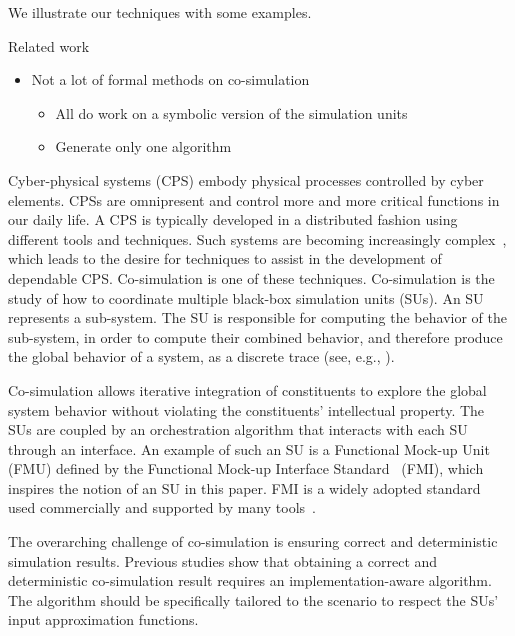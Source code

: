   We illustrate our techniques with some examples.
  
  Related work
  \begin{itemize}
    \item Not a lot of formal methods on co-simulation
    \begin{itemize}
      \item All do work on a symbolic version of the simulation units
      \item Generate only one algorithm
    \end{itemize}
  \end{itemize}

Cyber-physical systems (CPS) embody physical processes controlled by cyber elements. 
CPSs are omnipresent and control more and more critical functions in our daily life.
A CPS is typically developed in a distributed fashion using different tools and techniques. 
Such systems are becoming increasingly complex~\cite{4519604}, which leads to the desire for techniques to assist in the development of dependable CPS.
Co-simulation is one of these techniques. Co-simulation is the study of how to coordinate multiple black-box simulation units (SUs).
An SU represents a sub-system. 
The SU is responsible for computing the behavior of the sub-system, in order to compute their combined behavior, and therefore produce the global behavior of a system, as a discrete trace (see, e.g., \cite{Kubler2000,Gomes2018}).

Co-simulation allows iterative integration of constituents to explore the global system behavior without violating the constituents' intellectual property. 
The SUs are coupled by an orchestration algorithm that interacts with each SU through an interface.
An example of such an SU is a Functional Mock-up Unit (FMU) defined by the Functional Mock-up Interface Standard~\cite{FMI2014} (FMI), which inspires the notion of an SU in this paper. FMI is a widely adopted standard used commercially and supported by many tools~\cite{Tools_FMI}.

The overarching challenge of co-simulation is ensuring correct and deterministic simulation results. 
Previous studies \cite{Gomes2019,Oakes2021,Gomes2018f,Schweizer2015c} show that obtaining a correct and deterministic co-simulation result requires an implementation-aware algorithm.
The algorithm should be specifically tailored to the scenario to respect the SUs' input approximation functions.


